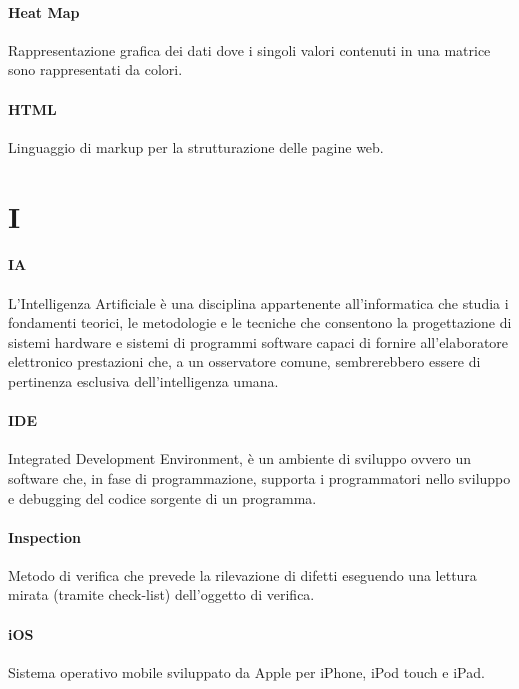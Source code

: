 \documentclass[]{article}
\begin{document}
	\paragraph*{Heat Map}
	Rappresentazione grafica dei dati dove i singoli valori contenuti in una matrice sono rappresentati da colori.
	
	\paragraph*{HTML}
	Linguaggio di markup per la strutturazione delle pagine web.
	
	\newpage
	
	\section*{I}
	
	\paragraph*{IA}
	L'Intelligenza Artificiale è una disciplina appartenente all'informatica che studia i fondamenti teorici, le metodologie e le tecniche che consentono la progettazione di sistemi hardware e sistemi di programmi software capaci di fornire all'elaboratore elettronico prestazioni che, a un osservatore comune, sembrerebbero essere di pertinenza esclusiva dell'intelligenza umana.
	
	\paragraph*{IDE}
	Integrated Development Environment, è un ambiente di sviluppo ovvero un software che, in fase di programmazione, supporta i programmatori nello sviluppo e debugging del codice sorgente di un programma.
	
	\paragraph*{Inspection}
	Metodo di verifica che prevede la rilevazione di difetti eseguendo una lettura mirata (tramite check-list) dell'oggetto di verifica.
	
	\paragraph*{iOS}
	Sistema operativo mobile sviluppato da Apple per iPhone, iPod touch e iPad.
	
\end{document}

